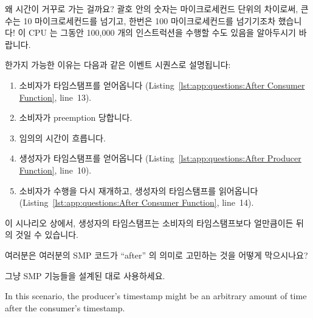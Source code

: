 왜 시간이 거꾸로 가는 걸까요?
괄호 안의 숫자는 마이크로세컨드 단위의 차이로써, 큰 수는 10 마이크로세컨드를
넘기고, 한번은 100 마이크로세컨드를 넘기기조차 했습니다!
이 CPU 는 그동안 100,000 개의 인스트럭션을 수행할 수도 있음을 알아두시기
바랍니다.

한가지 가능한 이유는 다음과 같은 이벤트 시퀀스로 설명됩니다:
\iffalse

Why is time going backwards?
The number in parentheses is the difference in microseconds, with
a large number exceeding 10 microseconds, and one exceeding even
100 microseconds!
Please note that this CPU can potentially execute more than 100,000
instructions in that time.

One possible reason is given by the following sequence of events:
\fi
\begin{enumerate}
\item	소비자가 타임스탬프를 얻어옵니다
	(Listing~\ref{lst:app:questions:After Consumer Function}, line~13).
\item	소비자가 preemption 당합니다.
\item	임의의 시간이 흐릅니다.
\item	생성자가 타임스탬프를 얻어옵니다
	(Listing~\ref{lst:app:questions:After Producer Function}, line~10).
\item	소비자가 수행을 다시 재개하고, 생성자의 타임스탬프를 읽어옵니다
	(Listing~\ref{lst:app:questions:After Consumer Function}, line~14).
\iffalse

\item	Consumer obtains timestamp
	(Listing~\ref{lst:app:questions:After Consumer Function}, line~13).
\item	Consumer is preempted.
\item	An arbitrary amount of time passes.
\item	Producer obtains timestamp
	(Listing~\ref{lst:app:questions:After Producer Function}, line~10).
\item	Consumer starts running again, and picks up the producer's
	timestamp
	(Listing~\ref{lst:app:questions:After Consumer Function}, line~14).
\fi
\end{enumerate}

이 시나리오 상에서, 생성자의 타임스탬프는 소비자의 타임스탬프보다 얼만큼이든
뒤의 것일 수 있습니다.

여러분은 여러분의 SMP 코드가 ``after'' 의 의미로 고민하는 것을 어떻게
막으시나요?

그냥 SMP 기능들을 설계된 대로 사용하세요.
\iffalse

In this scenario, the producer's timestamp might be an arbitrary
amount of time after the consumer's timestamp.

